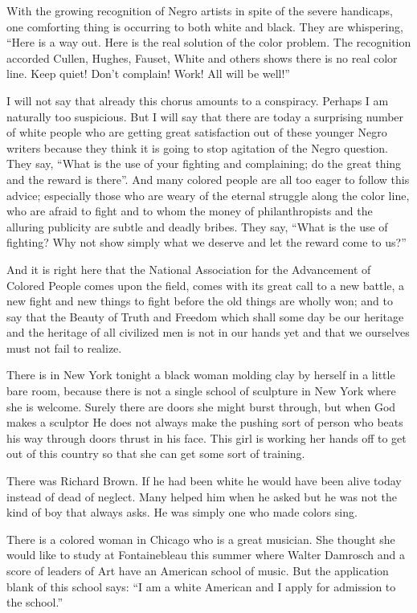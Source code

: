 \documentclass[letterpaper,10pt,english]{jupyterBook}
\begin{document}
\sphinxAtStartPar
With the growing recognition of Negro artists in spite of the severe handicaps, one comforting thing is occurring to both white and black. They are whispering, “Here is a way out. Here is the real solution of the color problem. The recognition accorded Cullen, Hughes, Fauset, White and others shows there is no real color line. Keep quiet! Don’t complain! Work! All will be well!”

\sphinxAtStartPar
I will not say that already this chorus amounts to a conspiracy. Perhaps I am naturally too suspicious. But I will say that there are today a surprising number of white people who are getting great satisfaction out of these younger Negro writers because they think it is going to stop agitation of the Negro question. They say, “What is the use of your fighting and complaining; do the great thing and the reward is there”. And many colored people are all too eager to follow this advice; especially those who are weary of the eternal struggle along the color line, who are afraid to fight and to whom the money of philanthropists and the alluring publicity are subtle and deadly bribes. They say, “What is the use of fighting? Why not show simply what we deserve and let the reward come to us?”

\sphinxAtStartPar
And it is right here that the National Association for the Advancement of Colored People comes upon the field, comes with its great call to a new battle, a new fight and new things to fight before the old things are wholly won; and to say that the Beauty of Truth and Freedom which shall some day be our heritage and the heritage of all civilized men is not in our hands yet and that we ourselves must not fail to realize.

\sphinxAtStartPar
There is in New York tonight a black woman molding clay by herself in a little bare room, because there is not a single school of sculpture in New York where she is welcome. Surely there are doors she might burst through, but when God makes a sculptor He does not always make the pushing sort of person who beats his way through doors thrust in his face. This girl is working her hands off to get out of this country so that she can get some sort of training.

\sphinxAtStartPar
There was Richard Brown. If he had been white he would have been alive today instead of dead of neglect. Many helped him when he asked but he was not the kind of boy that always asks. He was simply one who made colors sing.

\sphinxAtStartPar
There is a colored woman in Chicago who is a great musician. She thought she would like to study at Fontainebleau this summer where Walter Damrosch and a score of leaders of Art have an American school of music. But the application blank of this school says: “I am a white American and I apply for admission to the school.”
\end{document}

